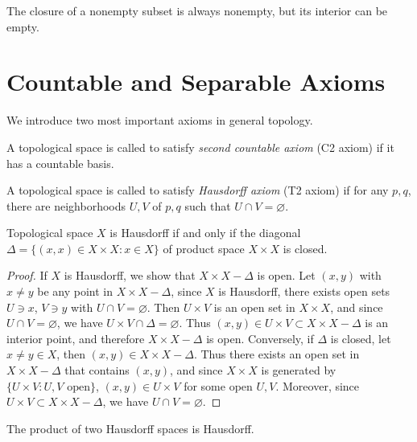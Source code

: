 \begin{rem}
    The closure of a nonempty subset is always nonempty, but its interior can be empty.
\end{rem}

\section{Countable and Separable Axioms}

We introduce two most important axioms in general topology.

\begin{defn}
    A topological space is called to satisfy \emph{second countable axiom} (C2 axiom) if it has a countable basis.
\end{defn}

\begin{defn}
    A topological space is called to satisfy \emph{Hausdorff axiom} (T2 axiom) if for any $p,q$, there are neighborhoods $U,V$ of $p,q$ such that $U\cap V=\varnothing$.
\end{defn}

\begin{prop}
    Topological space $X$ is Hausdorff if and only if the diagonal $\Delta=\{(x,x)\in X\times X\colon x\in X\}$ of product space $X\times X$ is closed.
\end{prop}
\begin{proof}
    If $X$ is Hausdorff, we show that $X\times X-\Delta$ is open.
    Let $(x,y)$ with $x\neq y$ be any point in $X\times X-\Delta$, since $X$ is Hausdorff, there exists open sets $U\ni x$, $V\ni y$ with $U\cap V=\varnothing$.
    Then $U\times V$ is an open set in $X\times X$, and since $U\cap V=\varnothing$, we have $U\times V\cap\Delta=\varnothing$.
    Thus $(x,y)\in U\times V\subset X\times X-\Delta$ is an interior point, and therefore $X\times X-\Delta$ is open.
    Conversely, if $\Delta$ is closed, let $x\neq y\in X$, then $(x,y)\in X\times X-\Delta$.
    Thus there exists an open set in $X\times X-\Delta$ that contains $(x,y)$, and since $X\times X$ is generated by $\{U\times V\colon U,V\text{ open}\}$, $(x,y)\in U\times V$ for some open $U,V$.
    Moreover, since $U\times V\subset X\times X-\Delta$, we have $U\cap V=\varnothing$.
\end{proof}

\begin{prop}
    The product of two Hausdorff spaces is Hausdorff.
\end{prop}

